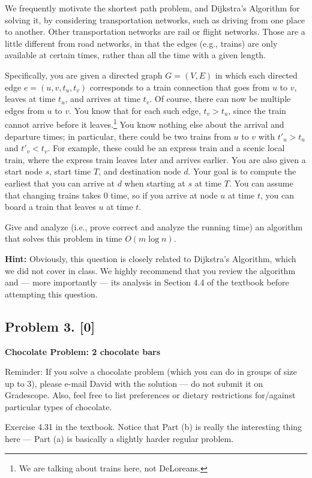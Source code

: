 \documentclass[10pt]{article}
\begin{document}
  We frequently motivate the shortest path problem, and Dijkstra's Algorithm for solving it, by considering transportation networks, such as driving from one place to another.
  Other transportation networks are rail or flight networks. Those are a little different from road networks, in that the edges (e.g., trains) are only available at certain times, rather than all the time with a given length.

  Specifically, you are given a directed graph $G=(V,E)$ in which each directed edge $e=(u,v,t_u,t_v)$ corresponds to a train connection that goes from $u$ to $v$, leaves at time $t_u$, and arrives at time $t_v$. Of course, there can now be multiple edges from $u$ to $v$. You know that for each such edge, $t_v > t_u$, since the train cannot arrive before it leaves.\footnote{We are talking about trains here, not DeLoreans.} You know nothing else about the arrival and departure times; in particular, there could be two trains from $u$ to $v$ with $t'_u > t_u$ and $t'_v < t_v$. For example, these could be an express train and a scenic local train, where the express train leaves later and arrives earlier.
  You are also given a start node $s$, start time $T$, and destination node $d$.
  Your goal is to compute the earliest that you can arrive at $d$ when starting at $s$ at time $T$. You can assume that changing trains takes 0 time, so if you arrive at node $u$ at time $t$, you can board a train that leaves $u$ at time $t$.

  Give and analyze (i.e., prove correct and analyze the running time) an algorithm that solves this problem in time $O(m \log n)$.

\noindent \textbf{Hint:} Obviously, this question is closely related to Dijkstra's Algorithm, which we did not cover in class. We highly recommend that you review the algorithm and --- more importantly --- its analysis in Section 4.4 of the textbook before attempting this question.


\subsection*{Problem 3. [0]}
\textbf{Chocolate Problem: 2 chocolate bars}

Reminder: If you solve a chocolate problem (which you can do in groups of size up to 3), please e-mail David with the solution --- do not submit it on Gradescope. Also, feel free to list preferences or dietary restrictions for/against particular types of chocolate.

Exercise 4.31 in the textbook. Notice that Part (b) is really the interesting thing here --- Part (a) is basically a slightly harder regular problem.
\end{document}
